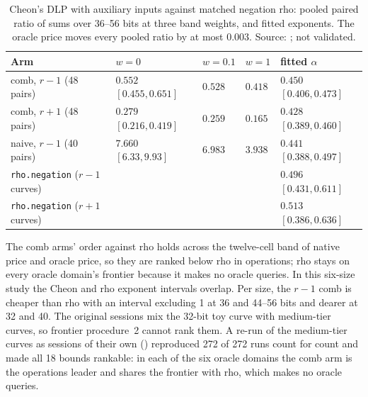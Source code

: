 \begin{table}[t]
\centering\small
\begin{tabular}{@{}lllll@{}}
\toprule
Arm & $w=0$ & $w=0.1$ & $w=1$ & fitted $\alpha$ \\
\midrule
comb, $r-1$ (48 pairs) & $0.552$ $[0.455,0.651]$ & $0.528$ & $0.418$ & $0.450$ $[0.406,0.473]$ \\
comb, $r+1$ (48 pairs) & $0.279$ $[0.216,0.419]$ & $0.259$ & $0.165$ & $0.428$ $[0.389,0.460]$ \\
naive, $r-1$ (40 pairs) & $7.660$ $[6.33,9.93]$ & $6.983$ & $3.938$ & $0.441$ $[0.388,0.497]$ \\
\addlinespace
\texttt{rho.negation} ($r-1$ curves) & & & & $0.496$ $[0.431,0.611]$ \\
\texttt{rho.negation} ($r+1$ curves) & & & & $0.513$ $[0.386,0.636]$ \\
\bottomrule
\end{tabular}
\caption[]{Cheon's DLP with auxiliary inputs against matched negation rho:
pooled paired ratio of sums over 36--56 bits at three band weights, and
fitted exponents. The oracle price moves every pooled ratio by at most
$0.003$. Source: ; not
validated.}
\label{tab:gf-cheon}
\end{table}

The comb arms' order against rho holds across the twelve-cell band of
native price and oracle price, so they are ranked below rho in operations;
rho stays on every oracle domain's frontier because it makes no oracle
queries. In this six-size study the Cheon and rho exponent intervals
overlap. Per size, the $r-1$ comb is cheaper than rho
with an interval excluding 1 at 36 and 44--56 bits and dearer at 32 and 40.
The original sessions mix the 32-bit toy curve with medium-tier curves, so
frontier procedure~2 cannot rank them. A re-run of the medium-tier curves
as sessions of their own ()
reproduced 272 of 272 runs count for count and made all 18 bounds rankable:
in each of the six oracle domains the comb arm is the operations leader and
shares the frontier with rho, which makes no oracle queries.


